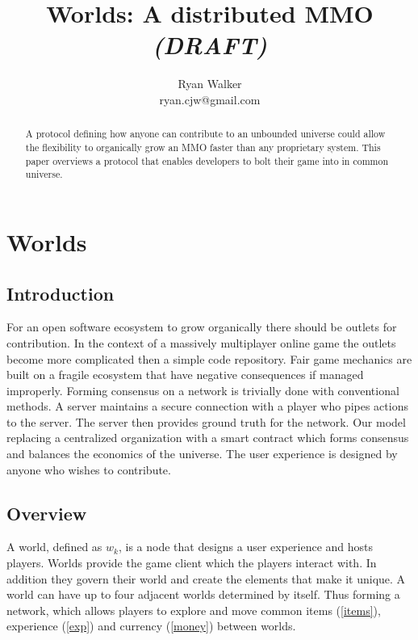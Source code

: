 \documentclass[runningheads,a4paper]{llncs}
\begin{document}
\def \SystemName {Worlds} %

\mainmatter  %

\title{\SystemName: A distributed MMO \textit{(DRAFT)}}

\author{Ryan Walker\\
				ryan.cjw@gmail.com}

\institute{} %

\maketitle

\begin{abstract}
A protocol defining how anyone can contribute to an unbounded universe could allow the flexibility to organically grow an MMO faster than any proprietary system. This paper overviews a protocol that enables developers to bolt their game into in common universe. 
\end{abstract}

\section{Worlds}
\subsection{Introduction}
For an open software ecosystem to grow organically there should be outlets for contribution. In the context of a massively multiplayer online game the outlets become more complicated then a simple code repository. Fair game mechanics are built on a fragile ecosystem that have negative consequences if managed improperly. Forming consensus on a network is trivially done with conventional methods. A server maintains a secure connection with a player who pipes actions to the server. The server then provides ground truth for the network. Our model replacing a centralized organization with a smart contract which forms consensus and balances the economics of the universe. The user experience is designed by anyone who wishes to contribute.

\subsection{Overview}
A world, defined as $w_k$, is a node that designs a user experience and hosts players. Worlds provide the game client which the players interact with. In addition they govern their world and create the elements that make it unique. A world can have up to four adjacent worlds determined by itself. Thus forming a network, which allows players to explore and move common items (\ref{items}), experience (\ref{exp}) and currency (\ref{money}) between worlds.
\end{document}
